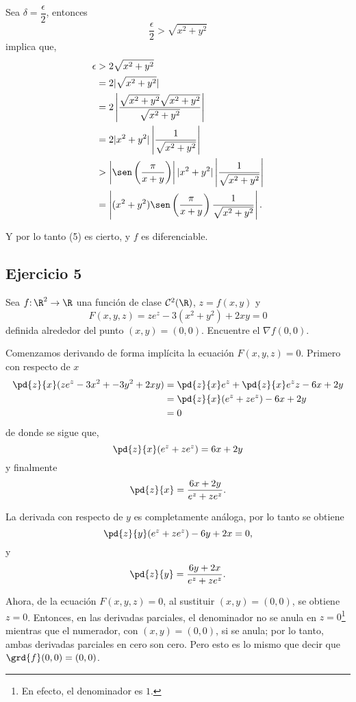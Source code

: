 \begin{sol}
	Sea $\delta = \dfrac{\epsilon}{2}$, entonces
	\[ \frac{\epsilon}{2} > \sqrt{x^2+y^2} \]
	implica que,
	\begin{align*}
	\epsilon &> 2\sqrt{x^2+y^2} \\
	&= 2|\sqrt{x^2+y^2}| \\
	&= 2\left| \frac{\sqrt{x^2+y^2}\sqrt{x^2+y^2}}{\sqrt{x^2+y^2}} \right| \\
	&= 2|x^2+y^2| \left| \frac{1}{\sqrt{x^2+y^2}} \right| \\
	&> \left| \sen\left(\frac{\pi}{x+y} \right) \right| |x^2+y^2| \left| \frac{1}{\sqrt{x^2+y^2}} \right| \\
	&= \left| (x^2+y^2) \sen\left(\frac{\pi}{x+y} \right)   \frac{1}{\sqrt{x^2+y^2}} \right|.
	\end{align*}
	
	Y por lo tanto (5) es cierto, y $f$ es diferenciable.
	
\end{sol}

\subsection*{Ejercicio 5}
	Sea $f\mathpunct{:} \R^2 \to \R$ una función de clase $\mathcal{C}^2(\R)$, $z=f(x,y)$ y 
\[ F(x,y,z) = ze^z - 3(x^2+y^2) + 2xy = 0 \] 
definida alrededor del punto $(x,y)=(0,0)$. Encuentre el $\nabla f(0,0)$.
\begin{sol}
	Comenzamos derivando de forma implícita la ecuación $F(x,y,z) = 0$. Primero con respecto de $x$
	\begin{align*}
	\pd{z}{x} (ze^z - 3x^2 +-3y^2 + 2xy) &= \pd{z}{x}e^z + \pd{z}{x}e^z z - 6x + 2y \\
	&= \pd{z}{x} (e^z+ze^z) - 6x+2y \\
	&=0  
	\end{align*}
	de donde se sigue que,
	\[ \pd{z}{x}(e^z+ze^z) = 6x+2y \]
	y finalmente
	\[ \pd{z}{x} = \frac{6x+2y}{e^z+ze^z}. \]
	
	La derivada con respecto de $y$ es completamente análoga, por lo tanto se obtiene
	\[ \pd{z}{y} (e^z+ze^z) - 6y+2x = 0, \]
	y
	\[ \pd{z}{y} = \frac{6y+2x}{e^z+ze^z}. \]
	
	Ahora, de la ecuación $F(x,y,z) = 0$, al sustituir $(x,y) = (0,0)$, se obtiene $z=0$. Entonces, en las derivadas parciales, el denominador no se anula en $z=0$\footnote{En efecto, el denominador es $1$.} mientras que el numerador, con $(x,y) = (0,0)$, si se anula; por lo tanto, ambas derivadas parciales  en cero son cero. Pero esto es lo mismo que decir que $\grd{f}(0,0) = (0,0)$.
\end{sol}
